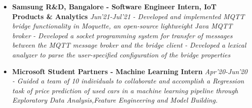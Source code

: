 \documentclass{article}
\begin{document}
\begin{itemize}
    \item{\textbf{\large{Samsung R\&D, Bangalore - Software Engineer Intern, IoT Products \& Analytics}}} \hfill \textit{Jun'21-Jul'21}
          \newline
          \textit{- Developed and implemented MQTT bridge functionality in Moquette, an open-source lightweight Java MQTT broker}
          \newline
          \textit{- Developed a socket programming system for transfer of messages between the MQTT message broker and the bridge client}
          \newline
          \textit{- Developed a lexical analyzer to parse the user-specified configuration of the bridge properties}
\end{itemize}


\begin{itemize}
    \item{\textbf{\large{Microsoft Student Partners - Machine Learning Intern}}} \hfill \textit{Apr'20-Jun'20}
          \newline
          \textit{- Guided a team of 10 individuals to collaborate and accomplish a Regression task of price prediction of used cars in a machine learning pipeline through Exploratory Data Analysis,Feature Engineering and Model Building.}

\end{itemize}


\end{document}
